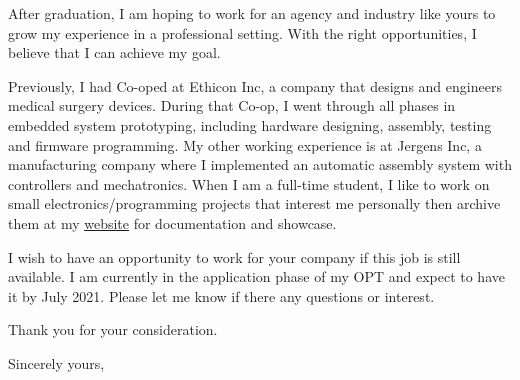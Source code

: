 \documentclass[11pt]{letter} %
\begin{document}
\begin{letter}
    \par After graduation, I am hoping to work for an agency and industry like yours to grow my experience in a professional setting.
    With the right opportunities, I believe that I can achieve my goal.

    \par Previously, I had Co-oped at Ethicon Inc, a company that designs and engineers medical surgery devices. During that Co-op, I went through all phases in embedded system prototyping, including hardware designing, assembly, testing and firmware programming.
    My other working experience is at Jergens Inc, a manufacturing company where I implemented an automatic assembly system with controllers and mechatronics.
    When I am a full-time student, I like to work on small electronics/programming projects that interest me personally then archive them at my \href{https://liu2z2.github.io/}{website} for documentation and showcase.

    \par I wish to have an opportunity to work for your company if this job is still available.
    I am currently in the application phase of my OPT and expect to have it by July 2021.
    Please let me know if there any questions or interest.

    \par Thank you for your consideration.

    \closing{Sincerely yours,}




\end{letter}
\end{document}
